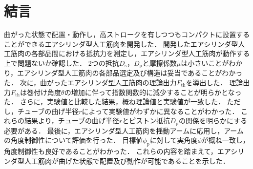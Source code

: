 \section{結言}%
曲がった状態で配置・動作し，高ストロークを有しつつもコンパクトに設置することができるエアシリンダ型人工筋肉を開発した．
開発したエアシリンダ型人工筋肉の各部品間における抵抗力を測定し，エアシリンダ型人工筋肉が動作する上で問題ないか確認した．
2つの抵抗$D_\mathrm{s}$，$D_\mathrm{p}$と摩擦係数$\mu$は小さいことがわかり，エアシリンダ型人工筋肉の各部品選定及び構造は妥当であることがわかった．
次に，曲がったエアシリンダ型人工筋肉の理論出力$F_\mathrm{th}$を導出した．
理論出力$F_\mathrm{th}$は巻付け角度$\theta$の増加に伴って指数関数的に減少することが明らかとなった．
さらに，実験値と比較した結果，概ね理論値と実験値が一致した．
ただし，チューブの曲げ半径$r$によって実験値がわずかに異なることがわかった．
これらの結果より，チューブの曲げ半径$r$とピストン抵抗$D_\mathrm{p}$の関係を明らかにする必要がある．
最後に，エアシリンダ型人工筋肉を揺動アームに応用し，アームの角度制御性について評価を行った．
目標値$\phi_\mathrm{p}$に対して実角度$\phi$が概ね一致し，角度制御性も良好であることがわかった．
これらの内容を踏まえて，エアシリンダ型人工筋肉が曲げた状態で配置及び動作が可能であることを示した．